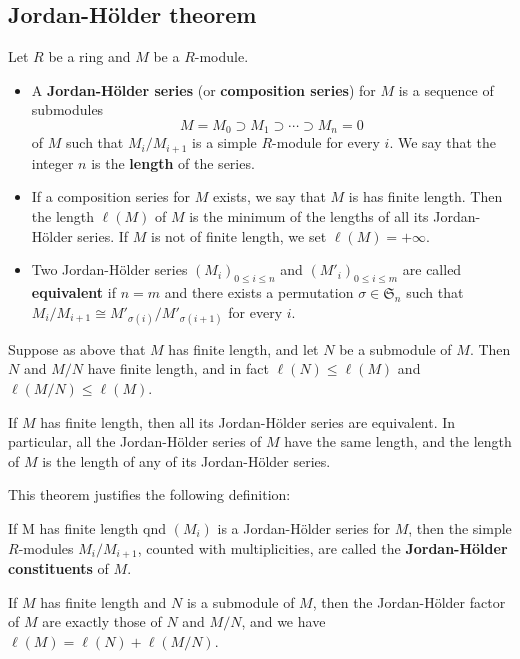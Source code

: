 \subsection{Jordan-H\"older theorem}
\begin{definition}
Let $R$ be a ring and $M$ be a $R$-module.
\begin{itemize}
\item A \textbf{Jordan-H\"older series} (or \textbf{composition series}) for $M$ is a sequence of submodules
\[M=M_0\supset M_1\supset\cdots\supset M_n=0\]
of $M$ such that $M_i/M_{i+1}$ is a simple $R$-module for every $i$. We say that the integer $n$ is the \textbf{length} of the series.
\item If a composition series for $M$ exists, we say that $M$ is has finite length. Then the length $\ell(M)$ of $M$ is the minimum of the lengths of all its Jordan-H\"older series. If $M$ is not of finite length, we set $\ell(M)=+\infty$.
\item Two Jordan-H\"older series $(M_i)_{0\leq i\leq n}$ and $(M'_i)_{0\leq i\leq m}$ are called \textbf{equivalent} if $n=m$ and there exists a permutation $\sigma\in\mathfrak{S}_n$ such that $M_i/M_{i+1}\cong M'_{\sigma(i)}/M'_{\sigma(i+1)}$ for every $i$.
\end{itemize}
\end{definition}
\begin{lemma}
Suppose as above that $M$ has finite length, and let $N$ be a submodule of $M$. Then $N$ and $M/N$ have finite length, and in fact $\ell(N)\leq\ell(M)$ and $\ell(M/N)\leq\ell(M)$.
\end{lemma}
\begin{theorem}
If $M$ has finite length, then all its Jordan-H\"older series are equivalent. In particular, all the Jordan-H\"older series of $M$ have the same length, and the length of $M$ is the length of any of its Jordan-H\"older series.
\end{theorem}
This theorem justifies the following definition:
\begin{definition}\label{module length quotient}
If M has finite length qnd $(M_i)$ is a Jordan-H\"older series for $M$, then the simple $R$-modules $M_i/M_{i+1}$, counted with multiplicities, are called the \textbf{Jordan-H\"older constituents} of $M$.
\end{definition}
\begin{corollary}
If $M$ has finite length and $N$ is a submodule of $M$, then the Jordan-H\"older factor of $M$ are exactly those of $N$ and $M/N$, and we have $\ell(M)=\ell(N)+\ell(M/N)$.
\end{corollary}
